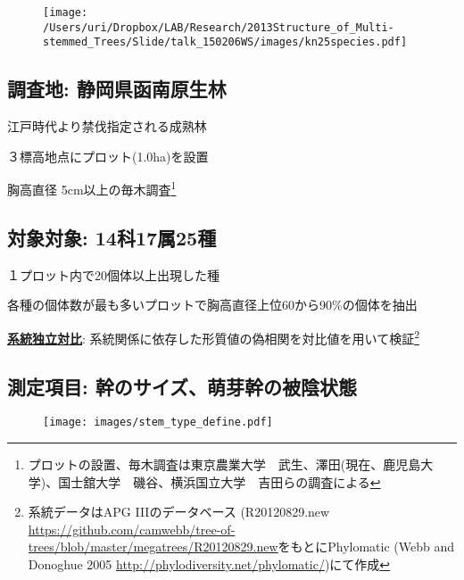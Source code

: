\documentclass[a0, 30pt, plainboxedsections]{sciposter} %
\begin{document}
\begin{multicols}{2}

\begin{wrapfigure}{r}{16.7em}
  \centering
    \texttt{[image: /Users/uri/Dropbox/LAB/Research/2013Structure\_of\_Multi-stemmed\_Trees/Slide/talk\_150206WS/images/kn25species.pdf]} %
\end{wrapfigure}

\subsection*{調査地: 静岡県函南原生林}

\faCaretRight 江戸時代より禁伐指定される成熟林

\faCaretRight ３標高地点にプロット(1.0ha)を設置

\faCaretRight 胸高直径 5cm以上の毎木調査\footnote{プロットの設置、毎木調査は東京農業大学　武生、澤田(現在、鹿児島大学)、国士舘大学　磯谷、横浜国立大学　吉田らの調査による}

\subsection*{対象対象: 14科17属25種}

\faCaretRight １プロット内で20個体以上出現した種

\faCaretRight 各種の個体数が最も多いプロットで胸高直径上位60から90\%の個体を抽出

\faCaretRight \textbf{\underline{系統独立対比}}: 系統関係に依存した形質値の偽相関を対比値を用いて検証\footnote{系統データはAPG I\hspace{-1pt}I\hspace{-1pt}Iのデータベース (R20120829.new \url{https://github.com/camwebb/tree-of-trees/blob/master/megatrees/R20120829.new}をもとにPhylomatic (Webb and Donoghue 2005 \url{http://phylodiversity.net/phylomatic/})にて作成}

\columnbreak
\subsection*{測定項目: 幹のサイズ、萌芽幹の被陰状態}

\begin{figure}
  \centering
	\texttt{[image: images/stem\_type\_define.pdf]}
\end{figure}

\vspace{-1.8em}\begin{figure}
 \begin{minipage}{0.6\hsize}

\end{minipage}
\end{figure}
\end{multicols}
\end{document}
